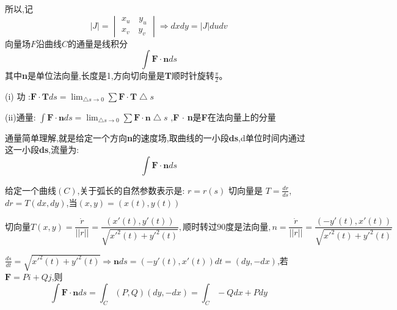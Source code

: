 \documentclass{ctexart}
\begin{document}
\begin{tcolorbox}[title = {关于变量替换dxdy=Jdudv},colbacktitle=green!35!black,colback=green!1,arc = 2mm, outer arc = 2mm,fonttitle = \itshape, fontupper = \itshape, fontlower = \itshape]
   所以,记$$ |J|=\begin{vmatrix}
   	x_{u} \quad y_{u}\\
   	x_{v} \quad y_{v}
   \end{vmatrix}\Rightarrow dxdy=|J|dudv$$
  \tcblower
  向量场$F$沿曲线$C$的通量是线积分$$\int \textbf{F} \cdot \textbf{n} ds  $$ 
  其中\textbf{n}是单位法向量,长度是1,方向切向量是\textbf{T}顺时针旋转$\displaystyle{\frac{\pi}{2}}$。 

  (i) 功 :$\displaystyle{\textbf{F} \cdot \textbf{T} ds} = \lim_{\bigtriangleup s \to 0} \sum \textbf{F} \cdot \textbf{T} \bigtriangleup s $
  
  (ii)通量: $\displaystyle{\int \textbf{F} \cdot \textbf{n} ds} = \lim_{\bigtriangleup s \to 0} \sum \textbf{F} \cdot \textbf{n} \bigtriangleup s $ ,\textbf{F} $\cdot$ \textbf{n}是\textbf{F}在法向量上的分量
  
    通量简单理解,就是给定一个方向\textbf{n}的速度场,取曲线的一小段\textbf{ds},d单位时间内通过这一小段\textbf{ds},流量为:$$\int \textbf{F} \cdot \textbf{n} ds  $$ 
    
    给定一个曲线$\left(C \right)$,关于弧长的自然参数表示是: $r=r(s)$
    切向量是 $\displaystyle{T =\frac{dr}{ds}}$,$dr =T(dx,dy)$,当$(x,y)=(x(t),y(t))$
    
    $$\text{切向量}T(x,y)=\frac{\dot{r} }{||r||}=\frac{(x'(t),y'(t))}{\sqrt{x'^{2}(t)+y'^{2}(t)}},\text{顺时转过90度是法向量},n=\frac{\dot{r} }{||r||}=\frac{(-y'(t),x'(t))}{\sqrt{x'^{2}(t)+y'^{2}(t)}}$$
    
    $\displaystyle{\frac{ds}{dt}=\sqrt{x'^{2}(t)+y'^{2}(t)}} \Rightarrow \textbf{n}ds=(-y'(t),x'(t))dt=(dy,-dx)$,若$\textbf{F}=Pi+Qj$,则$$\int \textbf{F} \cdot \textbf{n} ds =\int_{C} (P,Q)(dy,-dx)=\int_{C}-Qdx+Pdy$$
    
\end{tcolorbox}
\end{document}

